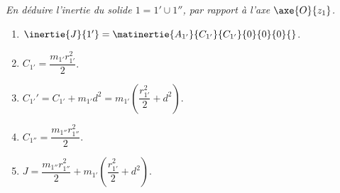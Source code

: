 \subparagraph{}
\textit{En déduire l’inertie du solide $1=1'\cup 1''$, par rapport à l’axe $\axe{O}{z_1}$.}
\ifprof
\begin{corrige}
\end{corrige}
\else
\fi




\begin{enumerate}
\item $\inertie{J}{1'}=\matinertie{A_{1'}}{C_{1'}}{C_{1'}}{0}{0}{0}{}$.
\item $C_{1'}=\dfrac{m_{1'}r_{1'}^2}{2}$.
\item $C_{1'}'=C_{1'}+m_{1'}d^2=m_{1'}\left(\dfrac{r_{1'}^2}{2}+d^2\right)$.
\item $C_{1''}=\dfrac{m_{1''}r_{1''}^2}{2}$.
\item $J=\dfrac{m_{1''}r_{1''}^2}{2}+m_{1'}\left(\dfrac{r_{1'}^2}{2}+d^2\right)$.
\end{enumerate}